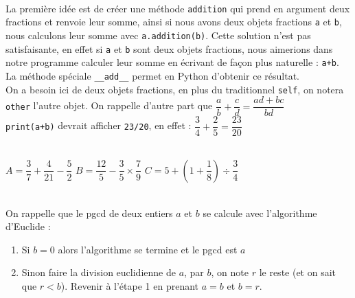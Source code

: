 \documentclass[11pt,a4paper]{article}
\begin{document}
\begin{Exercise}[title={POO et calcul sur les fractions},number=6]
	 \\
	La première idée est de créer une méthode {\tt addition} qui prend en argument deux fractions et renvoie leur somme, ainsi si nous avons deux objets fractions {\tt a} et {\tt b}, nous calculons leur somme avec {\tt a.addition(b)}. Cette solution n'est pas satisfaisante, en effet si {\tt a} et {\tt b} sont deux objets fractions, nous aimerions dans notre programme calculer leur somme en écrivant de façon plus naturelle : {\tt a+b}. La méthode spéciale {\tt \_\_add\_\_} permet en Python d'obtenir ce résultat.
	 \\
	\aide \; On a besoin ici de deux objets fractions, en plus du traditionnel {\tt self}, on notera {\tt other} l'autre objet. On rappelle d'autre part que $\dfrac{a}{b} + \dfrac{c}{d} = \dfrac{ad+bc}{bd} $
	 \\
	\aide \; {\tt print(a+b)} devrait afficher {\tt 23/20}, en effet : $\dfrac{3}{4}+\dfrac{2}{5} = \dfrac{23}{20}$


	\\
	$A = \dfrac{3}{7}+\dfrac{4}{21}-\dfrac{5}{2}$ \qquad \qquad  $B = \dfrac{12}{5} - \dfrac{3}{5}\times \dfrac{7}{9}$ \qquad \qquad $C = 5 + \left(1+ \dfrac{1}{8}\right)\div\dfrac{3}{4}$


	\\
	\aide \; On rappelle que le {\sc pgcd} de deux entiers $a$ et $b$ se calcule avec l'algorithme d'Euclide :
	\begin{enumerate}
		\item Si $b=0$ alors l'algorithme se termine et le {\sc pgcd} est $a$
		\item Sinon faire la division euclidienne de $a$, par $b$, on note $r$ le reste (et on sait que $r<b$). Revenir à l'étape 1 en prenant $a=b$ et $b=r$.
	\end{enumerate}
\end{Exercise}
\end{document}
